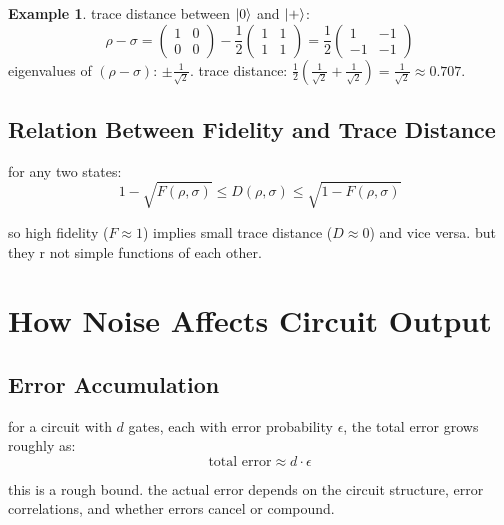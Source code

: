 \documentclass[11pt,a4paper]{article}
\theoremstyle{definition}
\newtheorem{example}{Example}[section]
\theoremstyle{remark}
\begin{document}
\begin{example}
trace distance between $\ket{0}$ and $\ket{+}$:
\[
\rho - \sigma = \begin{pmatrix} 1 & 0 \\ 0 & 0 \end{pmatrix} - \frac{1}{2}\begin{pmatrix} 1 & 1 \\ 1 & 1 \end{pmatrix} = \frac{1}{2}\begin{pmatrix} 1 & -1 \\ -1 & -1 \end{pmatrix}
\]
eigenvalues of $(\rho - \sigma)$: $\pm \frac{1}{\sqrt{2}}$. trace distance: $\frac{1}{2}(\frac{1}{\sqrt{2}} + \frac{1}{\sqrt{2}}) = \frac{1}{\sqrt{2}} \approx 0.707$.
\end{example}

\subsection{Relation Between Fidelity and Trace Distance}

for any two states:
\[
1 - \sqrt{F(\rho, \sigma)} \leq D(\rho, \sigma) \leq \sqrt{1 - F(\rho, \sigma)}
\]

so high fidelity ($F \approx 1$) implies small trace distance ($D \approx 0$) and vice versa. but they r not simple functions of each other.

\section{How Noise Affects Circuit Output}

\subsection{Error Accumulation}

for a circuit with $d$ gates, each with error probability $\epsilon$, the total error grows roughly as:
\[
\text{total error} \approx d \cdot \epsilon
\]

this is a rough bound. the actual error depends on the circuit structure, error correlations, and whether errors cancel or compound.
\end{document}
